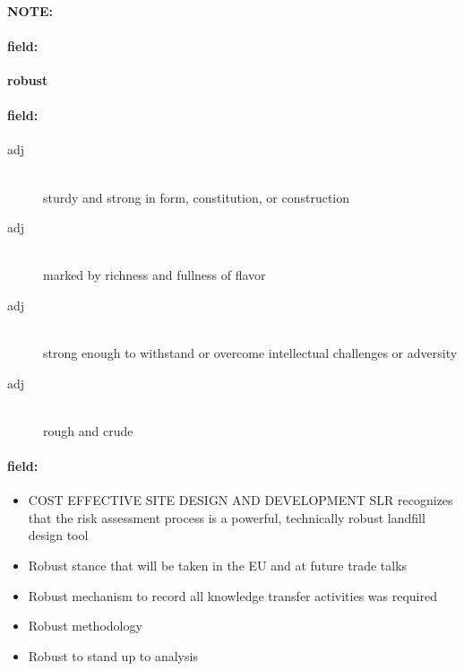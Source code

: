 \documentclass[12pt]{article}
\newenvironment{note}{\paragraph{NOTE:}}{}
\newenvironment{field}{\paragraph{field:}}{}
\begin{document}
\begin{note}
\begin{field}
\textbf{\large robust}
\end{field}


\begin{field}
\begin{description}
\item[adj] \hfill \\ 
sturdy and strong in form, constitution, or construction

\item[adj] \hfill \\ 
marked by richness and fullness of flavor

\item[adj] \hfill \\ 
strong enough to withstand or overcome intellectual challenges or adversity

\item[adj] \hfill \\ 
rough and crude

\end{description}
\end{field}

\begin{field}
\begin{itemize}
\item COST EFFECTIVE SITE DESIGN AND DEVELOPMENT SLR recognizes that the risk assessment process is a powerful, technically robust landfill design tool
\item Robust stance that will be taken in the EU and at future trade talks
\item Robust mechanism to record all knowledge transfer activities was required
\item Robust methodology
\item Robust to stand up to analysis
\end{itemize}
\end{field}
\end{note}
\end{document}
